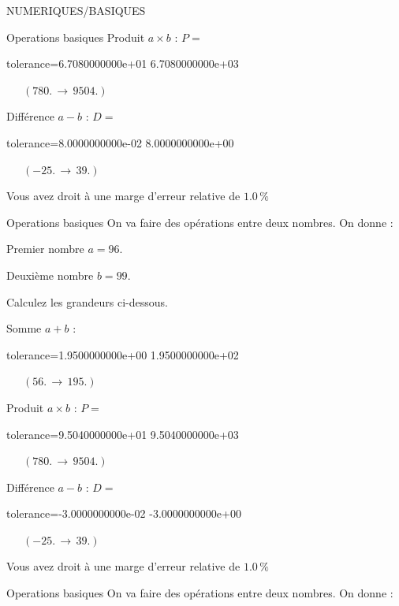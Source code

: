 \documentclass[12pt]{article}
\begin{document}
\begin{quiz}{NUMERIQUES/BASIQUES}
\begin{cloze}{Operations basiques}
Produit $ a \times b $ : $P =  $
\begin{numerical}[points=1] 
\item[tolerance={6.7080000000e+01}] 6.7080000000e+03 
\end{numerical} 
 $\,$ 
 $ \quad (780. \, \rightarrow \, 9504.) $ 

Différence $ a - b $ : $D =  $
\begin{numerical}[points=1] 
\item[tolerance={8.0000000000e-02}] 8.0000000000e+00 
\end{numerical} 
 $\,$ 
 $ \quad (-25. \, \rightarrow \, 39.) $ 

Vous avez droit à une marge d'erreur relative de $1.0\, \% $

\end{cloze} 


 \begin{cloze}{Operations basiques} 
On va faire des opérations entre deux nombres. On donne :

Premier nombre $a = 96.\, $

Deuxième nombre $b = 99.\, $

 

Calculez les grandeurs ci-dessous.

Somme $ a + b $ : 
\begin{numerical}[points=1] 
\item[tolerance={1.9500000000e+00}] 1.9500000000e+02 
\end{numerical} 
 $\,$ 
 $ \quad (56. \, \rightarrow \, 195.) $ 

Produit $ a \times b $ : $P =  $
\begin{numerical}[points=1] 
\item[tolerance={9.5040000000e+01}] 9.5040000000e+03 
\end{numerical} 
 $\,$ 
 $ \quad (780. \, \rightarrow \, 9504.) $ 

Différence $ a - b $ : $D =  $
\begin{numerical}[points=1] 
\item[tolerance={-3.0000000000e-02}] -3.0000000000e+00 
\end{numerical} 
 $\,$ 
 $ \quad (-25. \, \rightarrow \, 39.) $ 

Vous avez droit à une marge d'erreur relative de $1.0\, \% $

\end{cloze} 


 \begin{cloze}{Operations basiques} 
On va faire des opérations entre deux nombres. On donne :


\end{cloze}
\end{quiz}
\end{document}
